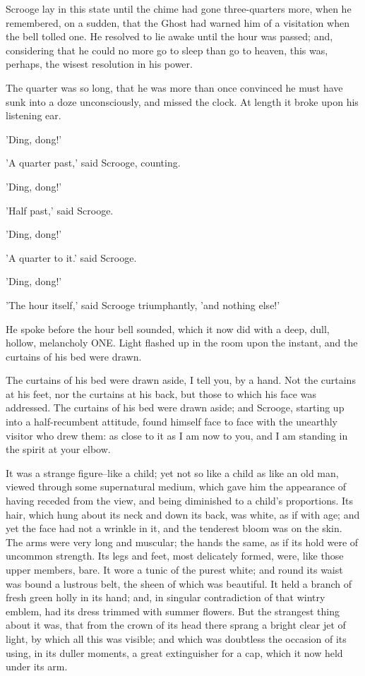 Scrooge lay in this state until the chime had gone three-quarters more,
when he remembered, on a sudden, that the Ghost had warned him of a
visitation when the bell tolled one. He resolved to lie awake until the
hour was passed; and, considering that he could no more go to sleep than
go to heaven, this was, perhaps, the wisest resolution in his power.

The quarter was so long, that he was more than once convinced he must
have sunk into a doze unconsciously, and missed the clock. At length it
broke upon his listening ear.

'Ding, dong!'

'A quarter past,' said Scrooge, counting.

'Ding, dong!'

'Half past,' said Scrooge.

'Ding, dong!'

'A quarter to it.' said Scrooge.

'Ding, dong!'

'The hour itself,' said Scrooge triumphantly, 'and nothing else!'

He spoke before the hour bell sounded, which it now did with a deep,
dull, hollow, melancholy ONE. Light flashed up in the room upon the
instant, and the curtains of his bed were drawn.

The curtains of his bed were drawn aside, I tell you, by a hand. Not
the curtains at his feet, nor the curtains at his back, but those to
which his face was addressed. The curtains of his bed were drawn aside;
and Scrooge, starting up into a half-recumbent attitude, found himself
face to face with the unearthly visitor who drew them: as close to it as
I am now to you, and I am standing in the spirit at your elbow.

It was a strange figure--like a child; yet not so like a child as like
an old man, viewed through some supernatural medium, which gave him the
appearance of having receded from the view, and being diminished to a
child's proportions. Its hair, which hung about its neck and down its
back, was white, as if with age; and yet the face had not a wrinkle in
it, and the tenderest bloom was on the skin. The arms were very long and
muscular; the hands the same, as if its hold were of uncommon strength.
Its legs and feet, most delicately formed, were, like those upper
members, bare. It wore a tunic of the purest white; and round its waist
was bound a lustrous belt, the sheen of which was beautiful. It held a
branch of fresh green holly in its hand; and, in singular contradiction
of that wintry emblem, had its dress trimmed with summer flowers. But
the strangest thing about it was, that from the crown of its head there
sprang a bright clear jet of light, by which all this was visible; and
which was doubtless the occasion of its using, in its duller moments, a
great extinguisher for a cap, which it now held under its arm.

